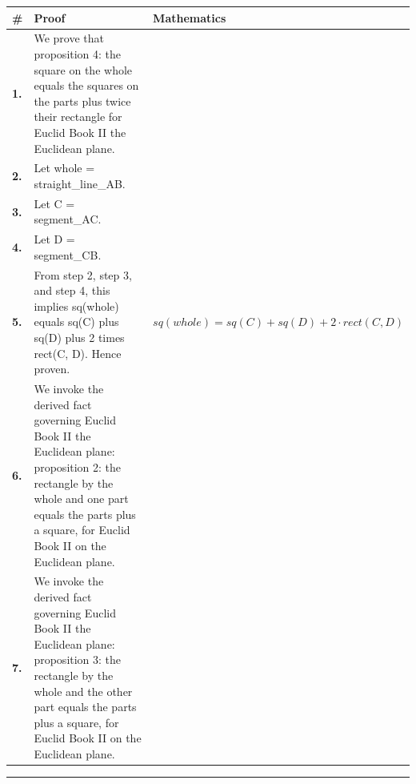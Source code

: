 \documentclass[11pt]{article}
\theoremstyle{definition}
\begin{document}
\begin{tabular}{@{} >{\raggedright\arraybackslash}p{} >{\raggedright\arraybackslash}p{} >{\raggedleft\arraybackslash}p{} @{}}
\textbf{\#} & \textbf{Proof} & \textbf{Mathematics} \\
\midrule
\textbf{1.} & We prove that proposition 4: the square on the whole equals the squares on the parts plus twice their rectangle for Euclid Book II the Euclidean plane. & \\[0.45em]
\textbf{2.} & Let whole = straight\_line\_AB. & \\[0.45em]
\textbf{3.} & Let C = segment\_AC. & \\[0.45em]
\textbf{4.} & Let D = segment\_CB. & \\[0.45em]
\textbf{5.} & From step 2, step 3, and step 4, this implies sq(whole) equals sq(C) plus sq(D) plus 2 times rect(C, D). Hence proven. & $\displaystyle sq(whole) = sq(C) + sq(D) + 2 \cdot rect(C, D)$ \\[0.45em]
\textbf{6.} & We invoke the derived fact governing Euclid Book II the Euclidean plane: proposition 2: the rectangle by the whole and one part equals the parts plus a square, for Euclid Book II on the Euclidean plane. & \\[0.45em]
\textbf{7.} & We invoke the derived fact governing Euclid Book II the Euclidean plane: proposition 3: the rectangle by the whole and the other part equals the parts plus a square, for Euclid Book II on the Euclidean plane. & \\[0.45em]
\bottomrule
\end{tabular}
\label{thm:Geometry-Euclid Book II-proposition_4_the_square_on_the_whole_equals_the_squares_on_the_parts_plus_twice_their_rectangle}
\par\medskip\hrule
\end{document}
